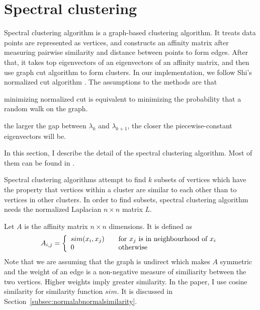 \section{Spectral clustering}
Spectral clustering algorithm is a graph-based clustering algorithm. 
It treats data points are represented as vertices, and constructs an affinity matrix after measuring pairwise similarity and distance between points to form edges. 
After that, it takes top eigenvectors of an eigenvectors of an affinity matrix, and then use graph cut algorithm to form clusters. 
In our implementation, we follow Shi's normalized cut algorithm \cite{jianbo03}. 
The assumptions to the methods are that \begin{inparaenum}[\itshape a\upshape)]
\item minimizing normalized cut is equivalent to minimizing the probability that a random walk on the graph.
\item the larger the gap between $\lambda_{k}$ and $\lambda_{k+1}$, the closer the piecewise-constant eigenvectors will be.
\end{inparaenum}
In this section, I describe the detail of the spectral clustering algorithm. 
Most of them can be found in \cite{ulrike07}. 

Spectral clustering algorithms attempt to find $k$ subsets of vertices which have the property that vertices within a cluster are similar to each other than to vertices in other clusters. 
In order to find subsets, spectral clustering algorithm needs the normalized Laplacian $n \times n$ matrix $L$. 

Let $A$ is the affinity matrix $n \times n$ dimensions. It is defined as 
\begin{equation}
A_{i,j} = \left\{ 
  \begin{array}{l l}
    sim(x_i, x_j) & \quad \text{for $x_j$ is in neighbourhood of $x_i$}\\
    0 & \quad \text{otherwise}
  \end{array} \right.
\end{equation}
Note that we are assuming that the graph is undirect which makes $A$ symmetric and the weight of an edge is a non-negative measure of similiarity between the two vertices. 
Higher weights imply greater similarity. 
In the paper, I use cosine similarity for similarity function $sim$. It is discussed in Section~\ref{subsec:normalabnormalsimilarity}. 

